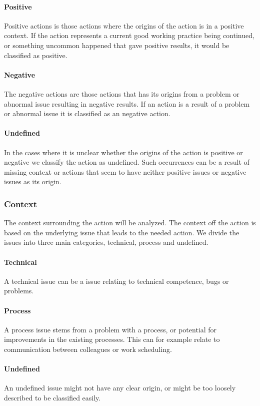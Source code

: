 \paragraph{Positive} Positive actions is those actions where the origins of the action is in a positive context. If the action represents a current good working practice being continued, or something uncommon happened that gave positive results, it would be classified as positive.
\paragraph{Negative} The negative actions are those actions that has its origins from a problem or abnormal issue resulting in negative results. If an action is a result of a problem or abnormal issue it is classified as an negative action. 
\paragraph{Undefined} In the cases where it is unclear whether the origins of the action is positive or negative we classify the action as undefined. Such occurrences can be a result of missing context or actions that seem to have neither positive issues or negative issues as its origin. 
\subsubsection{Context}\label{method:context}
The context surrounding the action will be analyzed. The context off the action is based on the underlying issue that leads to the needed action. We divide the issues into three main categories, technical, process and undefined. 
\paragraph{Technical}
A technical issue can be a issue relating to technical competence, bugs or problems.
\paragraph{Process}
A process issue stems from a problem with a process, or potential for improvements in the existing processes. This can for example relate to communication between colleagues or work scheduling.
\paragraph{Undefined}
 An undefined issue might not have any clear origin, or might be too loosely described to be classified easily.
